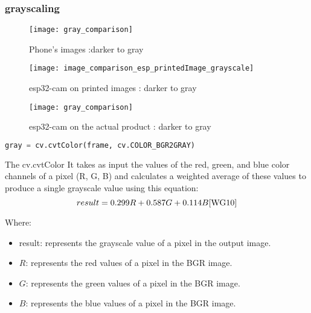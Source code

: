 \subsubsection{grayscaling}

\FloatBarrier
\begin{figure}[h]
\FloatBarrier
         \centering
        \texttt{[image: gray\_comparison]}
   
        \caption{Phone's images :darker to gray}
        \label{fig:Phone's images : darker to gray}
\FloatBarrier
    \end{figure}


\FloatBarrier
\FloatBarrier
\begin{figure}[h]
\FloatBarrier
         \centering
        \texttt{[image: image\_comparison\_esp\_printedImage\_grayscale]}
   
        \caption{esp32-cam on printed images : darker to gray}
        \label{fig:esp32-cam on printed images :  darker to gray}
\FloatBarrier
    \end{figure}


\FloatBarrier
\FloatBarrier
\begin{figure}[h]
\FloatBarrier
         \centering
        \texttt{[image: gray\_comparison]}
   
        \caption{esp32-cam on the actual product : darker to gray}
        \label{fig:Phone's images :  darker to gray}
\FloatBarrier
    \end{figure}


\FloatBarrier 
\begin{lstlisting}[language=Python]
 gray = cv.cvtColor(frame, cv.COLOR_BGR2GRAY)
\end{lstlisting}
The cv.cvtColor It takes as input the values of the red, green, and blue color channels of a pixel (R, G, B) and calculates a weighted average of these values to produce a single grayscale value using this equation:\cite{WG10}
\begin{equation}
result = 0.299 R + 0.587 G + 0.114 B \cite{WG10}
\end{equation}

Where:

\begin{itemize}
\item result: represents the grayscale value of a pixel in the output image.
\item $R$: represents the red values of a pixel in the BGR image.
\item $G$: represents the green values of a pixel in the BGR image.
\item $B$: represents the blue values of a pixel in the BGR image.
\end{itemize}
